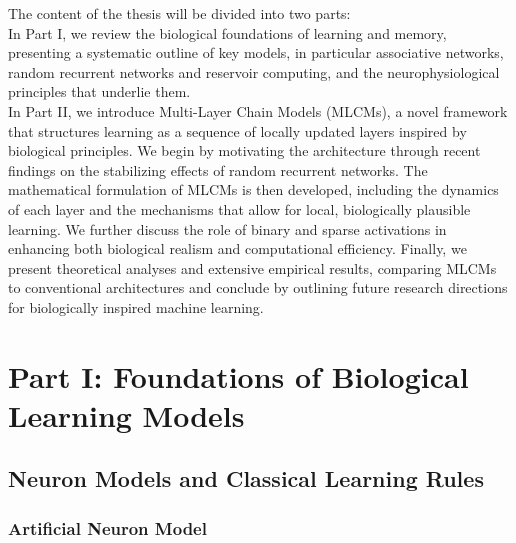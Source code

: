 \documentclass[a4paper,12pt]{report}
\begin{document}
The content of the thesis will be divided into two parts: \\ 
In Part I, we review the biological foundations of learning and memory, presenting a systematic 
outline of key models, in particular associative networks, random recurrent networks 
and reservoir computing, and the neurophysiological principles that underlie them. \\
In Part II, we introduce Multi-Layer Chain Models (MLCMs), a novel 
framework that structures learning as a sequence of locally updated layers inspired 
by biological principles. We begin by motivating the architecture through recent 
findings on the stabilizing effects of random recurrent networks. The mathematical 
formulation of MLCMs is then developed, including the dynamics of each layer and the 
mechanisms that allow for local, biologically plausible learning. We further discuss 
the role of binary and sparse activations in enhancing both biological realism and 
computational efficiency.
Finally, we present theoretical analyses and extensive empirical results, comparing 
MLCMs to conventional architectures and conclude by outlining future research 
directions for biologically inspired machine learning.






\part*{Part I: Foundations of Biological Learning Models}




\chapter{Neuron Models and Classical Learning Rules}
\section{Artificial Neuron Model}
\end{document}
